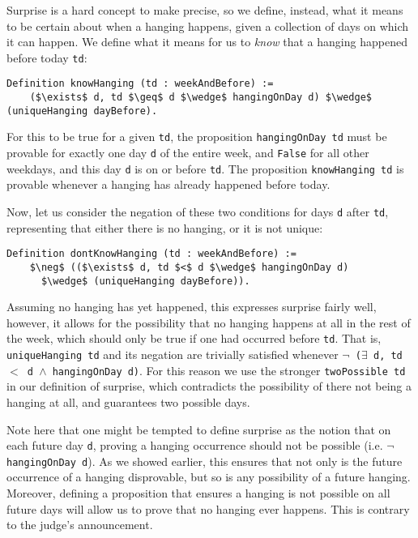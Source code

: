 \documentclass[runningheads]{llncs}
\begin{document}
Surprise is a hard concept to make precise, so we define, instead, what it means to be certain about
when a hanging happens, given a collection of days on which it can happen.
We define what it means for us to \emph{know} that a hanging happened before today {\tt td}:

\begin{lstlisting}[mathescape=true]
  Definition knowHanging (td : weekAndBefore) :=
    ($\exists$ d, td $\geq$ d $\wedge$ hangingOnDay d) $\wedge$ (uniqueHanging dayBefore).
\end{lstlisting}

For this to be true for a given {\tt td}, the proposition
{\tt hangingOnDay td} must be provable
for exactly one day {\tt d} of the entire week, and {\tt False} for all other
 weekdays, and this day {\tt d} is
on or before {\tt td}.
The proposition {\tt knowHanging td} is provable whenever a hanging has already
happened before today.

Now, let us consider the negation of these two conditions for days {\tt d} after
{\tt td}, representing that either there is no hanging, or it is not unique:

\begin{lstlisting}[mathescape=true]
  Definition dontKnowHanging (td : weekAndBefore) :=
    $\neg$ (($\exists$ d, td $<$ d $\wedge$ hangingOnDay d)
      $\wedge$ (uniqueHanging dayBefore)).
\end{lstlisting}

Assuming no
hanging has yet happened, this expresses surprise fairly
well, however, it allows for the possibility that no hanging happens at all in the
rest of the week, which should only be true if one had occurred before {\tt td}.
That is, {\tt uniqueHanging td} and its negation are trivially
satisfied whenever {\tt $\neg$ ($\exists$ d, td $<$ d $\wedge$ hangingOnDay d)}. For this
reason we use the stronger {\tt twoPossible td} in our definition of surprise,
which contradicts the possibility of there not being a hanging at all, and
guarantees two possible days.

Note here that one might be tempted to define surprise as the notion that on each future day {\tt d}, proving a hanging
occurrence should not be possible (i.e. {\tt $\neg$ hangingOnDay d}).
As we showed earlier, this ensures that not only is the future occurrence of a hanging
disprovable, but so is any possibility of a future hanging.
Moreover, defining a proposition that ensures a hanging is not possible on all
future days will allow us to prove that no hanging ever happens.
This is contrary to the judge's announcement.
\end{document}
